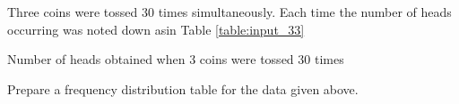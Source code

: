 Three coins were tossed 30 times simultaneously. Each time the number of heads occurring was noted down asin Table \ref{table:input_33}

\begin{table}[ht!]
\centering

\caption{Number of heads obtained when 3 coins were tossed 30 times}
\label{table:input_33}
\end{table}
Prepare a frequency distribution table for the data given above.\\
